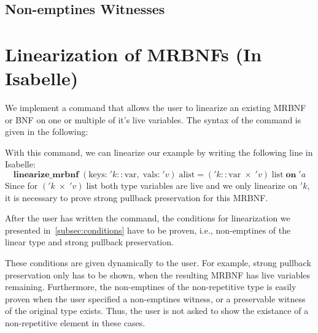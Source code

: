   \subsection{Non-emptines Witnesses}
  \label{subsec:wits}

  \section{Linearization of MRBNFs (In Isabelle)}
    We implement a command that allows the user to linearize an existing \ac{MRBNF} or \ac{BNF} on one or multiple of it's live variables. The syntax of the command is given in the following:

    

    With this command, we can linearize our example by writing the following line in Isabelle:
    \begin{equation*}
      \textbf{linearize\_mrbnf}\; (\text{keys:}\; 'k :: \text{var},\; \text{vals:}\; 'v)\; \text{alist} = ('k :: \text{var}\; \times\; 'v)\; \text{list}\; \textbf{on}\; 'a
    \end{equation*}
    Since for $('k\; \times\; 'v)\; \text{list}$ both type variables are live and we only linearize on $'k$, it is necessary to prove strong pullback preservation for this \ac{MRBNF}. 

    After the user has written the command, the conditions for linearization we presented in~\autoref{subsec:conditions} have to be proven, i.e., non-emptines of the linear type and strong pullback preservation. 
    
    These conditions are given dynamically to the user. For example, strong pullback preservation only has to be shown, when the resulting \ac{MRBNF} has live variables remaining. Furthermore, the non-emptines of the non-repetitive type is easily proven when the user specified a non-emptines witness, or a preservable witness of the original type exists. Thus, the user is not asked to show the existance of a non-repetitive element in these cases.

    
    

    

  